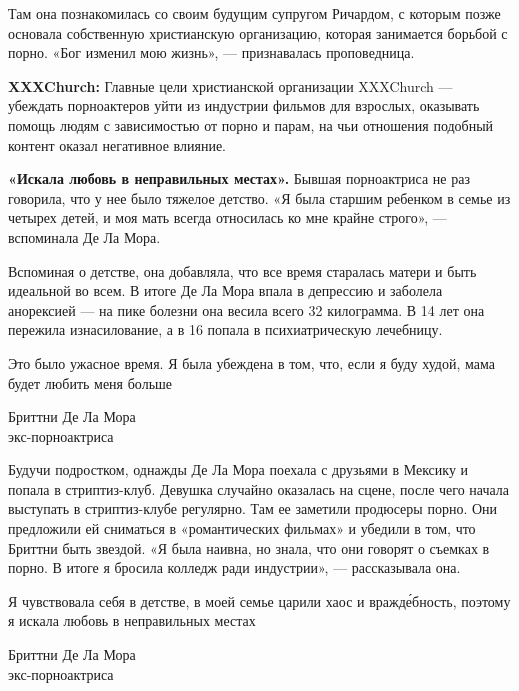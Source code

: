 Там она познакомилась со своим будущим супругом Ричардом, с которым позже основала собственную христианскую организацию, которая занимается борьбой с порно. «Бог изменил мою жизнь», --- признавалась проповедница.

\begin{framed}
    \textbf{XXXChurch:} Главные цели христианской организации XXXChurch --- убеждать порноактеров уйти из индустрии фильмов для взрослых, оказывать помощь людям с зависимостью от порно и парам, на чьи отношения подобный контент оказал негативное влияние.
\end{framed}

\textbf{«Искала любовь в неправильных местах».} Бывшая порноактриса не раз говорила, что у нее было тяжелое детство. «Я была старшим ребенком в семье из четырех детей, и моя мать всегда относилась ко мне крайне строго», --- вспоминала Де Ла Мора.

Вспоминая о детстве, она добавляла, что все время старалась  матери и быть идеальной во всем. В итоге Де Ла Мора впала в депрессию и заболела анорексией --- на пике болезни она весила всего 32 килограмма. В 14 лет она пережила изнасилование, а в 16 попала в психиатрическую лечебницу.


\begin{fancyquotes}
    Это было ужасное время. Я была убеждена в том, что, если я буду худой, мама будет любить меня больше\\

    \begin{flushright}
        Бриттни Де Ла Мора\\
        экс-порноактриса
    \end{flushright}
\end{fancyquotes}

Будучи подростком, однажды Де Ла Мора поехала с друзьями в Мексику и попала в стриптиз-клуб. Девушка случайно оказалась на сцене, после чего начала выступать в стриптиз-клубе регулярно. Там ее заметили продюсеры порно. Они предложили ей сниматься в «романтических фильмах» и убедили в том, что Бриттни  быть звездой. «Я была наивна, но знала, что они говорят о съемках в порно. В итоге я бросила колледж ради индустрии», --- рассказывала она.

\begin{fancyquotes}
    Я чувствовала себя  в детстве, в моей семье царили хаос и вражд\'{е}бность, поэтому я искала любовь в неправильных местах\\

    \begin{flushright}
        Бриттни Де Ла Мора\\
        экс-порноактриса
    \end{flushright}
\end{fancyquotes}

